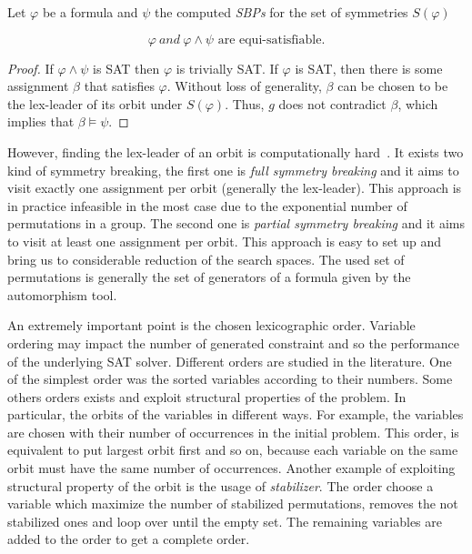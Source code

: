 \begin{theorem}
	\label{theorem:satisfiability_preservation_SBPs}
	Let $\varphi$ be a formula and $\psi$ the computed \textit{SBPs} for the set of
	symmetries $S(\varphi)$
	
	$$\varphi~and ~\varphi \wedge \psi \text{ are equi-satisfiable}.$$
\end{theorem}

\begin{proof}
	If $\varphi \wedge \psi$ is SAT then $\varphi$ is trivially SAT. If
	$\varphi$ is SAT, then there is some assignment $\beta$ that satisfies $\varphi$.
	Without loss of generality, $\beta$ can be chosen to be the lex-leader of its
	orbit under $S(\varphi)$. Thus, $g$ does not contradict $\beta$, which implies that
	$\beta \models \psi$.
\end{proof}

 


However, finding the lex-leader of an orbit is computationally hard~\cite{Luks2004}.
It exists two kind of symmetry breaking, the first one is \emph{full symmetry breaking} and it 
aims to visit exactly one assignment per orbit (generally the lex-leader). This
approach is in practice infeasible in the most case due to the exponential number of permutations in a group.
The second one is \emph{partial symmetry breaking} and it aims to visit at least one assignment per orbit. This approach is easy to set up and bring us to considerable reduction of the search spaces. The used set
of permutations is generally the set of generators of a formula given by the automorphism tool.


An extremely important point is the chosen lexicographic order.
Variable ordering may impact the number of generated constraint and so the performance of
the underlying SAT solver. Different orders are studied in the literature. 
One of the simplest order was the sorted variables according to their numbers.
Some others orders exists and exploit structural properties of the 
problem. In particular, the orbits of the variables in different ways. For example, the variables are chosen 
with their number of occurrences in the initial problem. This order, is equivalent to put largest orbit first
and so on, because each variable on the same orbit must have the same number of occurrences.
Another example of exploiting structural property of the orbit is the usage of \emph{stabilizer}.
The order choose a variable which maximize the number of stabilized permutations, removes the not stabilized ones and loop over until the empty set. The remaining variables are added to the order to get a complete order.


